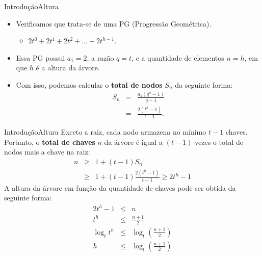 \documentclass[aspectratio=169]{beamer}
\begin{document}

\begin{frame}{Introdução}{Altura}
\begin{itemize}
\item Verificamos que trata-se de uma PG (Progressão Geométrica).
\begin{itemize}
\item $2t^{0} + 2t^{1} + 2t^{2} + ...  + 2t^{h-1}$.
\end{itemize} 
\item Essa PG possui $a_1 = 2$, a razão $q=t$, e a quantidade de elementos $n=h$, em que $h$ é a altura da árvore. 
\item Com isso, podemos calcular o {\bf total de nodos} $S_n$ da seguinte forma:
\begin{eqnarray}
S_n &=& \frac{ a_1 ( q^n - 1)} {q - 1} \nonumber \\
    &=& \frac{ 2 ( t^h - 1)} {t - 1}.\nonumber
\end{eqnarray}
\end{itemize}
\end{frame}



\begin{frame}{Introdução}{Altura}
Exceto a raiz, cada nodo armazena no mínimo $t-1$ chaves. Portanto, o {\bf total de chaves} $n$ da árvore é igual a $(t-1)$ vezes o total de nodos mais a chave na raiz:
\begin{eqnarray}
n &\geq& 1 + (t-1) S_n \nonumber \\
  &\geq& 1 + (t-1) \frac{ 2 (t^h - 1)} {t - 1} \geq  2 t^h - 1 \nonumber
\end{eqnarray}
A altura da árvore em função da quantidade de chaves pode ser obtida da seguinte forma:
\begin{eqnarray}
2 t^h - 1 &\leq & n \nonumber \\
t^h &\leq & \frac{n + 1}{2} \nonumber \\
\log_t t^h &\leq & \log_t (\frac{n + 1}{2}) \nonumber \\
 h &\leq &\log_t (\frac{n + 1}{2}) \nonumber
\end{eqnarray}
\end{frame}

\end{document}
